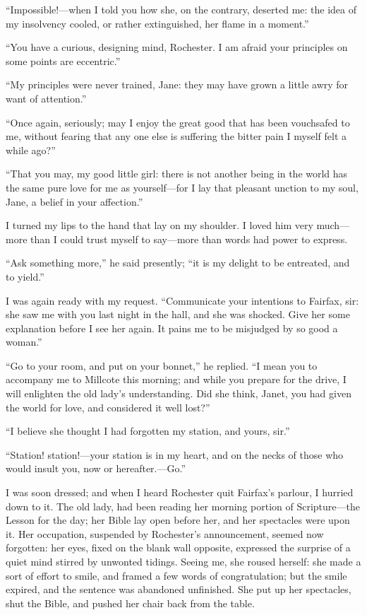 \enquote{Impossible!---when I told you how she, on the contrary,
deserted me: the idea of my insolvency cooled, or rather extinguished,
her flame in a moment.}

\enquote{You have a curious, designing mind, \Mr{} Rochester.  I am afraid
your principles on some points are eccentric.}

\enquote{My principles were never trained, Jane: they may have grown a
little awry for want of attention.}

\enquote{Once again, seriously; may I enjoy the great good that has been
vouchsafed to me, without fearing that any one else is suffering the
bitter pain I myself felt a while ago?}

\enquote{That you may, my good little girl: there is not another being
in the world has the same pure love for me as yourself---for I lay that
pleasant unction to my soul, Jane, a belief in your affection.}

I turned my lips to the hand that lay on my shoulder.  I loved him very
much---more than I could trust myself to say---more than words had power
to express.

\enquote{Ask something more,} he said presently; \enquote{it is my
delight to be entreated, and to yield.}

I was again ready with my request.  \enquote{Communicate your intentions
to \Mrs{} Fairfax, sir: she saw me with you last night in the hall, and
she was shocked.  Give her some explanation before I see her again.  It
pains me to be misjudged by so good a woman.}

\enquote{Go to your room, and put on your bonnet,} he replied. 
\enquote{I mean you to accompany me to Millcote this morning; and while
you prepare for the drive, I will enlighten the old lady's
understanding.  Did she think, Janet, you had given the world for love,
and considered it well lost?}

\enquote{I believe she thought I had forgotten my station, and yours,
sir.}

\enquote{Station! station!---your station is in my heart, and on the
necks of those who would insult you, now or hereafter.---Go.}

I was soon dressed; and when I heard \Mr{} Rochester quit \Mrs{} Fairfax's
parlour, I hurried down to it.  The old lady, had been reading her
morning portion of Scripture---the Lesson for the day; her Bible lay
open before her, and her spectacles were upon it.  Her occupation,
suspended by \Mr{} Rochester's announcement, seemed now forgotten: her
eyes, fixed on the blank wall opposite, expressed the surprise of a
quiet mind stirred by unwonted tidings.  Seeing me, she roused herself:
she made a sort of effort to smile, and framed a few words of
congratulation; but the smile expired, and the sentence was abandoned
unfinished.  She put up her spectacles, shut the Bible, and pushed her
chair back from the table.

